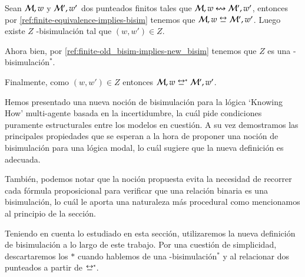 \begin{demostracion}
    Sean $\mathcal{M},w$ y $\mathcal{M}',w'$ dos \ultss punteados finitos tales que $\mathcal{M},w \mathrel{\leftrightsquigarrow} \mathcal{M}', w'$, entonces por \ref{ref:finite-equivalence-implies-bisim}
    tenemos que $\model,w \bisim \model', w'$. Luego existe $Z$ \KHilogic-bisimulación tal que $(w,w') \in Z$.

    Ahora bien, por \ref{ref:finite-old_bisim-implies-new_bisim} tenemos que $Z$ es una \KHilogic-bisimulación$^*$.

    Finalmente, como $(w,w') \in Z$ entonces $\model,w \bisim^* \model', w'$.
\end{demostracion}

Hemos presentado una nueva noción de bisimulación para la lógica `Knowing How' multi-agente basada en la incertidumbre, la 
cuál pide condiciones puramente estructurales entre los modelos en cuestión. A su vez demostramos las principales propiedades que se 
esperan a la hora de proponer una noción de bisimulación para una lógica modal, lo cuál sugiere que la nueva definición es adecuada.

También, podemos notar que la noción propuesta evita la necesidad de recorrer cada fórmula proposicional para verificar que una relación binaria
es una bisimulación, lo cuál le aporta una naturaleza más procedural como mencionamos al principio de la sección.  

Teniendo en cuenta lo estudiado en esta sección, utilizaremos la nueva definición de bisimulación a lo largo de este trabajo.
Por una cuestión de simplicidad, descartaremos los $*$ cuando hablemos de una \KHilogic-bisimulación$^*$ y 
al relacionar dos \ultss punteados a partir de $\bisim^*$.
